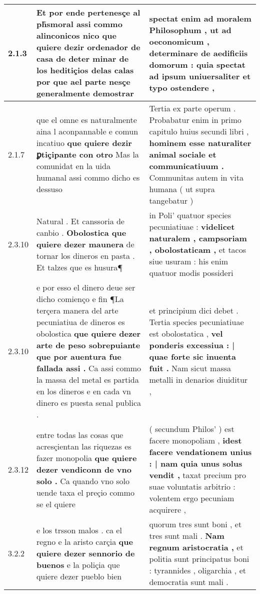\begin{tabular}{|p{1cm}|p{6.5cm}|p{6.5cm}|}
2.1.3 & Et por ende pertenesçe al ph̃smoral assi commo alinconicos nico \textbf{ que quiere dezir ordenador de casa } de deter minar de los heditiçios delas calas por que ael parte nesçe generalmente demostrar & spectat enim ad moralem Philosophum , ut ad oeconomicum , \textbf{ determinare de aedificiis domorum : } quia spectat ad ipsum uniuersaliter et typo ostendere , \\\hline
2.1.7 & que el omne es naturalmente aina l aconpannable e comun incatiuo \textbf{ que quiere dezir ꝑtiçipante con otro } Mas la comunidat en la uida humanal assi commo dicho es dessuso & Tertia ex parte operum . Probabatur enim in primo capitulo huius secundi libri , \textbf{ hominem esse naturaliter animal sociale et communicatiuum . } Communitas autem in vita humana ( ut supra tangebatur ) \\\hline
2.3.10 & Natural . Et canssoria de canbio . \textbf{ Obolostica que quiere dezer maunera } de tornar los dineros en pasta . Et talzes que es husura¶ & in Poli’ quatuor species pecuniatiuae : \textbf{ videlicet naturalem , campsoriam , obolostaticam , } et tacos siue usuram : his enim quatuor modis possideri \\\hline
2.3.10 & e por esso el dinero deue ser dicho comienço e fin ¶La terçera manera del arte pecuniatiua de dineros es obolostica \textbf{ que quiere dezer arte de peso sobrepuiante que por auentura fue fallada assi . } Ca assi commo la massa del metal es partida en los dineros e en cada vn dinero es puesta senal publica . & et principium dici debet . Tertia species pecuniatiuae est obolostatica , \textbf{ vel ponderis excessiua : | quae forte sic inuenta fuit . } Nam sicut massa metalli in denarios diuiditur , \\\hline
2.3.12 & entre todas las cosas que acresçientan las riquezas es fazer monopolia \textbf{ que quiere dezer vendiconn de vno solo . } Ca quando vno solo uende taxa el preçio commo se el quiere & ( secundum Philos’ ) est facere monopoliam , \textbf{ idest facere vendationem unius : | nam quia unus solus vendit , } taxat precium pro suae voluntatis arbitrio : volentem ergo pecuniam acquirere , \\\hline
3.2.2 & e los trsson malos . ca el regno e la aristo carçia \textbf{ que quiere dezer sennorio de buenos } e la poliçia que quiere dezer pueblo bien & quorum tres sunt boni , et tres sunt mali . \textbf{ Nam regnum aristocratia , } et politia sunt principatus boni : tyrannides , oligarchia , et democratia sunt mali . \\\hline

\end{tabular}
